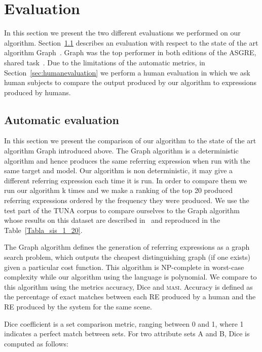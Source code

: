 \section{Evaluation} \label{sec:evaluation}

In this section we present the two different evaluations we performed on our algorithm. Section~\ref{sec:automaticevaluation} describes an evaluation with respect to the state of the art algorithm Graph~\cite{KrahmerGRAPH}. Graph was the top performer in both editions of the ASGRE, shared task~\cite{gatt-balz-kow:2008:ENLG}. Due to the limitations of the automatic metrics, in Section~\ref{sec:humanevaluation} we perform a human evaluation in  which we ask human subjects to compare the output produced by our algorithm to expressions produced by humans. 
  

\subsection{Automatic evaluation} \label{sec:automaticevaluation}

In this section we present the comparison of our algorithm to the state of the art algorithm Graph introduced above. The Graph algorithm is a deterministic algorithm and hence produces the same referring expression when run with the same target and model. Our algorithm is non deterministic, it may give a different referring expression each time it is run. In order to compare them we run our algorithm k times and we make a ranking of the top 20 produced referring expressions ordered by the frequency they were produced. We use the test part of the TUNA corpus to compare ourselves to the Graph algorithm whose results on this dataset are described in~\cite{KrahmerGRAPH} and reproduced in the Table~\ref{Tabla_sis_1_20}. 

The Graph algorithm defines the generation of referring expressions as a graph search problem, which outputs the cheapest distinguishing graph (if one exists) given a particular cost function. This algorithm is NP-complete in worst-case complexity while our algorithm using the \el language is polynomial. We compare to this algorithm using the metrics accuracy, Dice and \textsc{masi}. Accuracy is defined as the percentage of exact matches between each RE produced by a human and the RE produced by the system for the same scene. 

Dice coefficient is a set comparison metric, ranging between 0 and 1, where
1 indicates a perfect match between sets. For two
attribute sets A and B, Dice is computed as follows:\\

